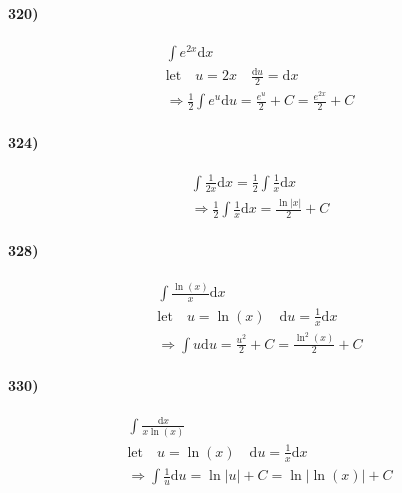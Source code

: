     \begin{multicols*}{2}
        \paragraph*{320)}
        \begin{equation*}
            \begin{gathered}
                \int e^{2x}\mathrm{d}x  \\
                \text{let} \quad u = 2x \quad \frac{\mathrm{d}u}{2} = \mathrm{d}x   \\
                \Rightarrow\frac{1}{2}\int e^u \mathrm{d}u = \frac{e^u}{2} + C = \boxed{\frac{e^{2x}}{2} + C}
            \end{gathered}
        \end{equation*}
        \horizontal

        \paragraph*{324)}
        \begin{equation*}
            \begin{gathered}
                \int \frac{1}{2x}\mathrm{d}x = \frac{1}{2}\int \frac{1}{x}\mathrm{d}x \\
                \Rightarrow \frac{1}{2}\int \frac{1}{x}\mathrm{d}x = \boxed{\frac{\ln|x|}{2} + C}
            \end{gathered}
        \end{equation*}
        \horizontal

        \paragraph*{328)}
        \begin{equation*}
            \begin{gathered}
                \int \frac{\ln(x)}{x}\mathrm{d}x    \\
                \text{let} \quad u = \ln(x) \quad \mathrm{d}u = \frac{1}{x}\mathrm{d}x  \\
                \Rightarrow \int u \mathrm{d}u = \frac{u^2}{2} + C = \boxed{\frac{\ln^2(x)}{2} + C}
            \end{gathered}
        \end{equation*}
        \horizontal

        \paragraph*{330)}
        \begin{equation*}
            \begin{gathered}
                \int \frac{\mathrm{d}x}{x\ln(x)}    \\
                \text{let} \quad u = \ln(x) \quad \mathrm{d}u = \frac{1}{x}\mathrm{d}x  \\
                \Rightarrow \int \frac{1}{u} \mathrm{d}u = \ln|u| + C = \boxed{\ln|\ln(x)| + C}
            \end{gathered}
        \end{equation*}
        \horizontal


\end{multicols*}
